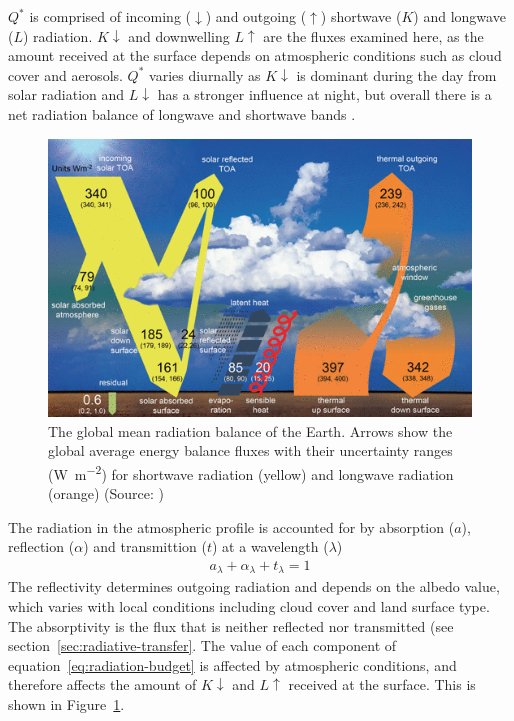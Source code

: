 \documentclass[a4paper,titlepage, twoside]{report}
\newcommand\Kdown{K\!\!\downarrow}
\newcommand\Ldown{L\!\!\downarrow}
\newcommand\Lup{L\!\!\uparrow}
\begin{document}
$Q^\ast$ is comprised of incoming ($\downarrow$) and outgoing ($\uparrow$) shortwave ($K$) and longwave ($L$) radiation. $\Kdown$ and downwelling $\Lup$ are the fluxes examined here, as the amount received at the surface depends on atmospheric conditions such as cloud cover and aerosols. $Q^\ast$ varies diurnally as $\Kdown$ is dominant during the day from solar radiation and $\Ldown$ has a stronger influence at night, but overall there is a net radiation balance of longwave and shortwave bands \parencite{oke}.

\begin{figure}
\centering
\includegraphics[width=\textwidth]{radiation.png}
\caption{The global mean radiation balance of the Earth. Arrows show the global average energy balance fluxes with their uncertainty ranges (\si{\watt\per\meter\squared}) for shortwave radiation (yellow) and longwave radiation (orange) (Source: \cite{wild})}
\label{fig:energy-budget}
\end{figure}

The radiation in the atmospheric profile is accounted for by absorption ($a$), reflection ($\alpha$) and transmittion ($t$) at a wavelength ($\lambda$) \parencite{fest}
\begin{align}
a_\lambda + \alpha_\lambda + t_\lambda = 1 \label{eq:radiation-budget}
\end{align}
The reflectivity determines outgoing radiation and depends on the albedo value, which varies with local conditions including cloud cover and land surface type. The absorptivity is the flux that is neither reflected nor transmitted (see section~\ref{sec:radiative-transfer}.  The value of each component of equation~\ref{eq:radiation-budget} is affected by atmospheric conditions, and therefore affects the amount of $\Kdown$ and $\Lup$ received at the surface. This is shown in Figure~\ref{fig:energy-budget}.
\end{document}
